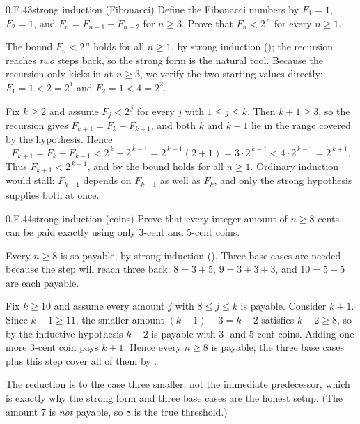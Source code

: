 \documentclass[main.tex]{subfiles}
\begin{document}
\begin{Exercise}{0.E.43}{strong induction (Fibonacci)}
Define the Fibonacci numbers by $F_1=1$, $F_2=1$, and $F_{n}=F_{n-1}+F_{n-2}$ for $n\ge 3$. Prove that
$F_n<2^{\,n}$ for every $n\ge 1$.
\end{Exercise}
\begin{Solution}
The bound $F_n<2^{\,n}$ holds for all $n\ge 1$, by strong induction (); the recursion
reaches \emph{two} steps back, so the strong form is the natural tool. Because the recursion only
kicks in at $n\ge 3$, we verify the two starting values directly: $F_1=1<2=2^1$ and $F_2=1<4=2^2$.

Fix $k\ge 2$ and assume $F_j<2^{\,j}$ for every $j$ with $1\le j\le k$. Then $k+1\ge 3$, so the
recursion gives $F_{k+1}=F_k+F_{k-1}$, and both $k$ and $k-1$ lie in the range covered by the
hypothesis. Hence
\[
F_{k+1}=F_k+F_{k-1}<2^{\,k}+2^{\,k-1}=2^{\,k-1}(2+1)=3\cdot 2^{\,k-1}<4\cdot 2^{\,k-1}=2^{\,k+1}.
\]
Thus $F_{k+1}<2^{\,k+1}$, and by  the bound holds for all $n\ge 1$. Ordinary induction
would stall: $F_{k+1}$ depends on $F_{k-1}$ as well as $F_k$, and only the strong hypothesis supplies
both at once.
\end{Solution}

\begin{Exercise}{0.E.44}{strong induction (coins)}
Prove that every integer amount of $n\ge 8$ cents can be paid exactly using only $3$-cent and $5$-cent
coins.
\end{Exercise}
\begin{Solution}
Every $n\ge 8$ is so payable, by strong induction (). Three base cases are needed because
the step will reach three back: $8=3+5$, $9=3+3+3$, and $10=5+5$ are each payable.

Fix $k\ge 10$ and assume every amount $j$ with $8\le j\le k$ is payable. Consider $k+1$. Since
$k+1\ge 11$, the smaller amount $(k+1)-3=k-2$ satisfies $k-2\ge 8$, so by the inductive hypothesis
$k-2$ is payable with $3$- and $5$-cent coins. Adding one more $3$-cent coin pays $k+1$. Hence every
$n\ge 8$ is payable; the three base cases plus this step cover all of them by .

The reduction is to the case three smaller, not the immediate predecessor, which is exactly why the
strong form and three base cases are the honest setup. (The amount $7$ is \emph{not} payable, so $8$ is
the true threshold.)
\end{Solution}
\end{document}

